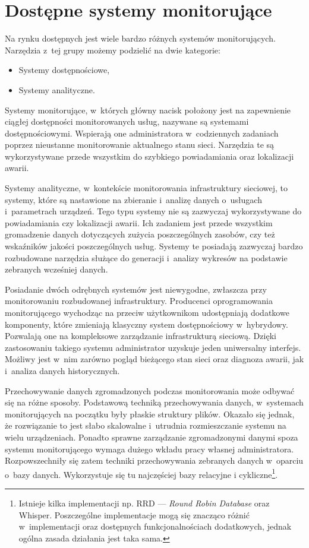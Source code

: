 \chapter{Dostępne systemy monitorujące}
\label{chap:Systemy}

Na rynku dostępnych jest wiele bardzo różnych systemów
monitorujących. Narzędzia z~tej grupy możemy podzielić na dwie
kategorie:

\begin{itemize}
\item Systemy dostępnościowe,
\item Systemy analityczne.
\end{itemize}

Systemy monitorujące, w~których główny nacisk położony jest na
zapewnienie ciągłej dostępności monitorowanych usług, nazywane są
systemami dostępnościowymi. Wspierają one administratora
w~codziennych zadaniach poprzez nieustanne monitorowanie aktualnego
stanu sieci. Narzędzia te są wykorzystywane przede wszystkim do
szybkiego powiadamiania oraz lokalizacji awarii.

Systemy analityczne, w~kontekście monitorowania infrastruktury
sieciowej, to systemy, które są nastawione na zbieranie i~analizę
danych o~usługach i~parametrach urządzeń. Tego typu systemy nie są
zazwyczaj wykorzystywane do powiadamiania czy lokalizacji awarii. Ich
zadaniem jest przede wszystkim gromadzenie danych dotyczących zużycia
poszczególnych zasobów, czy też wskaźników jakości poszczególnych
usług. Systemy te posiadają zazwyczaj bardzo rozbudowane narzędzia
służące do generacji i~analizy wykresów na podstawie zebranych
wcześniej danych.

Posiadanie dwóch odrębnych systemów jest niewygodne, zwłaszcza przy
monitorowaniu rozbudowanej infrastruktury. Producenci oprogramowania
monitorującego wychodząc na przeciw użytkownikom udostępniają
dodatkowe komponenty, które zmieniają klasyczny system dostępnościowy
w~hybrydowy. Pozwalają one na kompleksowe zarządzanie infrastrukturą
sieciową. Dzięki zastosowaniu takiego systemu administrator uzyskuje
jeden uniwersalny interfejs. Możliwy jest w~nim zarówno pogląd
bieżącego stan sieci oraz diagnoza awarii, jak i~analiza danych
historycznych.

Przechowywanie danych zgromadzonych podczas monitorowania może odbywać
się na różne sposoby. Podstawową techniką przechowywania danych,
w~systemach monitorujących na początku były płaskie struktury
plików. Okazało się jednak, że rozwiązanie to jest słabo skalowalne
i~utrudnia rozmieszczanie systemu na wielu urządzeniach. Ponadto
sprawne zarządzanie zgromadzonymi danymi spoza systemu monitorującego
wymaga dużego wkładu pracy własnej administratora. Rozpowszechniły się
zatem techniki przechowywania zebranych danych w~oparciu o~bazy
danych. Wykorzystuje się tu najczęściej bazy relacyjne i
cykliczne\footnote{ Istnieje kilka implementacji np. RRD --- {\em
    Round Robin Database}\cite{www:RRDtool} oraz
  Whisper\cite{www:Whisper}. Poszczególne implementacje mogą się
  znacząco różnić w~implementacji oraz dostępnych funkcjonalnościach
  dodatkowych, jednak ogólna zasada działania jest taka sama.}.

